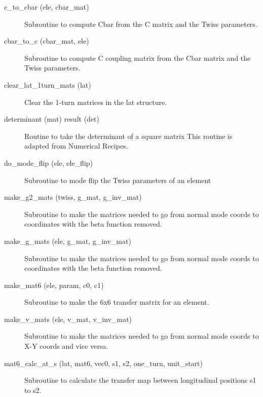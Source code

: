 \begin{description}

\label{r:c.to.cbar}
\item[c_to_cbar (ele, cbar_mat)] \Newline
Subroutine to compute Cbar from the C matrix and the Twiss parameters. 

\label{r:cbar.to.c}
\item[cbar_to_c (cbar_mat, ele)] \Newline
Subroutine to compute C coupling matrix from the Cbar matrix and the Twiss parameters. 

\label{r:clear.lat.1turn.mats}
\item[clear_lat_1turn_mats (lat)] \Newline
Clear the 1-turn matrices in the lat structure. 

\label{r:determinant}
\item[determinant (mat) result (det)] \Newline 
Routine to take the determinant of a square matrix
This routine is adapted from Numerical Recipes.

\label{r:do.mode.flip}
\item[do_mode_flip (ele, ele_flip)] \Newline
Subroutine to mode flip the Twiss parameters of an element 

\label{r:make.g2.mats}
\item[make_g2_mats (twiss, g_mat, g_inv_mat)] \Newline
Subroutine to make the matrices needed to go from normal mode coords to 
coordinates with the beta function removed. 

\label{r:make.g.mats}
\item[make_g_mats (ele, g_mat, g_inv_mat)] \Newline
Subroutine to make the matrices needed to go from normal mode coords to 
coordinates with the beta function removed. 

\label{r:make.mat6}
\item[make_mat6 (ele, param, c0, c1)] \Newline
Subroutine to make the 6x6 transfer matrix for an element. 

\label{r:make.v.mats}
\item[make_v_mats (ele, v_mat, v_inv_mat)] \Newline
Subroutine to make the matrices needed to go from normal mode coords to X-Y 
coords and vice versa. 

\label{r:mat6.calc.at.s}
\item[mat6_calc_at_s (lat, mat6, vec0, s1, s2, one_turn, unit_start)] \Newline 
Subroutine to calculate the transfer map between longitudinal positions
s1 to s2.


\end{description}
